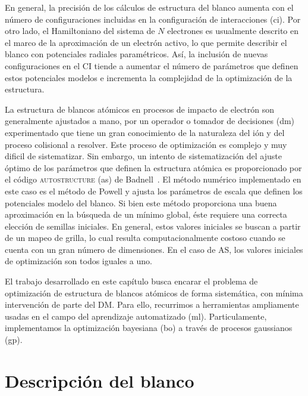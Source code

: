 En general, la precisión de los cálculos de estructura del blanco aumenta 
con el número de configuraciones incluidas en la configuración de 
interacciones (\acs{ci}). Por otro lado, el Hamiltoniano del sistema de 
$N$ electrones es usualmente descrito en el marco de la aproximación de 
un electrón activo, lo que permite describir el blanco con potenciales 
radiales paramétricos. Así, la inclusión de nuevas configuraciones en el 
CI tiende a aumentar el número de parámetros que definen estos 
potenciales modelos e incrementa la complejidad de la optimización de la 
estructura. 

La estructura de blancos atómicos en procesos de impacto de electrón
son generalmente ajustados a mano, por un operador o tomador de 
decisiones (\acs{dm}) experimentado que tiene un gran conocimiento de la
naturaleza del ión y del proceso colisional a resolver. Este proceso de 
optimización es complejo y muy dificil de sistematizar. Sin embargo, un 
intento de sistematización del ajuste óptimo de los parámetros que 
definen la estructura atómica es proporcionado por el código 
\textsc{autostructure} (\acs{as}) de Badnell~\cite{Badnell:11}. El método 
numérico implementado en este caso es el método de Powell y ajusta los 
parámetros de escala que definen los potenciales modelo del blanco. Si 
bien este método proporciona una buena aproximación en la búsqueda de un 
mínimo global, éste requiere una correcta elección de semillas iniciales. 
En general, estos valores iniciales se buscan a partir de un mapeo de 
grilla, lo cual resulta computacionalmente costoso cuando se cuenta con 
un gran número de dimensiones. En el caso de AS, los valores iniciales de 
optimización son todos iguales a uno.

El trabajo desarrollado en este capítulo busca encarar el problema de 
optimización de estructura de blancos atómicos de forma sistemática, con 
mínima intervención de parte del DM. Para ello, recurrimos a herramientas
ampliamente usadas en el campo del aprendizaje automatizado (\acs{ml}). 
Particulamente, implementamos la optimización bayesiana (\acs{bo}) a 
través de procesos gaussianos (\acs{gp}). 

\section{Descripción del blanco}

